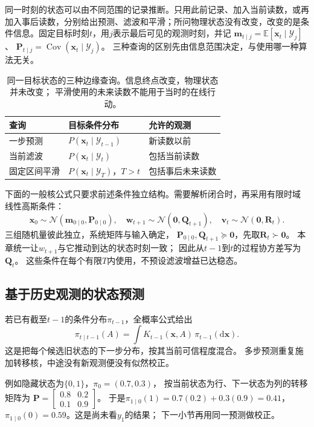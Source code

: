 \label{sec:dynamical-kalman-rts}

同一时刻的状态可以由不同范围的记录推断。只用此前记录、加入当前读数，或再加入事后读数，分别给出预测、滤波和平滑；所问物理状态没有改变，改变的是条件信息。固定目标时刻$t$，用$j$表示最后可见的观测时刻，并记
$\bm m_{t\mid j}=\mathbb E[\bm x_t\mid\mathcal Y_j]$、
$\bm P_{t\mid j}=\operatorname{Cov}(\bm x_t\mid\mathcal Y_j)$。
三种查询的区别先由信息范围决定，与使用哪一种算法无关。

\begin{table}[htbp]
 \centering
 \begin{tabularx}{\linewidth}{lXX}
 \toprule
 查询 & 目标条件分布 & 允许的观测\\
 \midrule
 一步预测 & $P(\bm x_t\mid\mathcal Y_{t-1})$ & 新读数以前\\
 当前滤波 & $P(\bm x_t\mid\mathcal Y_t)$ & 包括当前读数\\
 固定区间平滑 & $P(\bm x_t\mid\mathcal Y_T)$，$T>t$ & 包括事后未来读数\\
 \bottomrule
 \end{tabularx}
 \caption{同一目标状态的三种边缘查询。信息终点改变，物理状态并未改变；
 平滑使用的未来读数不能用于当时的在线行动。}
 \label{tab:dynamical-estimation-information}
\end{table}

下面的一般核公式只要求前述条件独立结构。需要解析闭合时，再采用有限时域
线性高斯条件：
\[
 \bm x_0\sim\mathcal N(\bm m_{0\mid0},\bm P_{0\mid0}),\quad
 \bm w_{t+1}\sim\mathcal N(\bm0,\bm Q_{t+1}),\quad
 \bm v_t\sim\mathcal N(\bm0,\bm R_t).
\]
三组随机量彼此独立，系统矩阵与输入确定，
$\bm P_{0\mid0},\bm Q_{t+1}\succeq\bm0$，先取$\bm R_t\succ\bm0$。
本章统一让$w_{t+1}$与它推动到达的状态时刻一致；
因此从$t-1$到$t$的过程协方差写为$\bm Q_t$。
这些条件在每个有限$T$内使用，不预设滤波增益已达稳态。

\subsection{基于历史观测的状态预测}
若已有截至$t-1$的条件分布$\pi_{t-1}$，全概率公式给出
\begin{equation}
 \pi_{t\mid t-1}(A)
     =\int K_{t-1}(\bm x,A)\,\pi_{t-1}(\mathrm d\bm x).
 \label{eq:dynamical-general-prediction-kernel}
\end{equation}
这是把每个候选旧状态的下一步分布，按其当前可信程度混合。
多步预测重复施加转移核，中途没有新观测便没有似然校正。

例如隐藏状态为$\{0,1\}$，$\pi_0=(0.7,0.3)$，
按当前状态为行、下一状态为列的转移矩阵为
$\bm P=\left[\begin{smallmatrix}0.8&0.2\\0.1&0.9\end{smallmatrix}\right]$。
于是$\pi_{1\mid0}(1)=0.7(0.2)+0.3(0.9)=0.41$，
$\pi_{1\mid0}(0)=0.59$。这是尚未看$y_1$的结果；
下一小节再用同一预测做校正。

